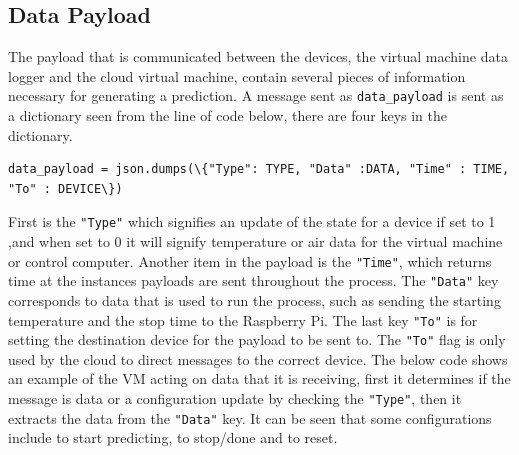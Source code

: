 \documentclass{article}
\begin{document}
\subsection{Data Payload}
The payload that is communicated between the devices, the virtual machine data logger and the cloud virtual machine, contain several pieces of information necessary for generating a prediction. A message sent as \lstinline{data_payload} is sent as a dictionary seen from the line of code below, there are four keys in the dictionary. 
\begin{lstlisting}
data_payload = json.dumps(\{"Type": TYPE, "Data" :DATA, "Time" : TIME, "To" : DEVICE\})
\end{lstlisting}
First is the \lstinline{"Type"} which signifies an update of the state for a device if set to 1 ,and when set to 0 it will signify temperature or air data for the virtual machine or control computer.  Another item in the payload is the \lstinline{"Time"}, which returns time at the instances payloads are sent throughout the process. The \lstinline{"Data"} key corresponds to data that is used to run the process, such as sending the starting temperature and the stop time to the Raspberry Pi. The last key \lstinline{"To"} is for setting the destination device for the payload to be sent to. The \lstinline{"To"} flag is only used by the cloud to direct messages to the correct device. The below code shows an example of the VM acting on data that it is receiving, first it determines if the message is data or a configuration update by checking the \lstinline{"Type"}, then it extracts the data from the \lstinline{"Data"} key. It can be seen that some configurations include to start predicting, to stop/done and to reset. 
 
 \medskip


\end{document}
